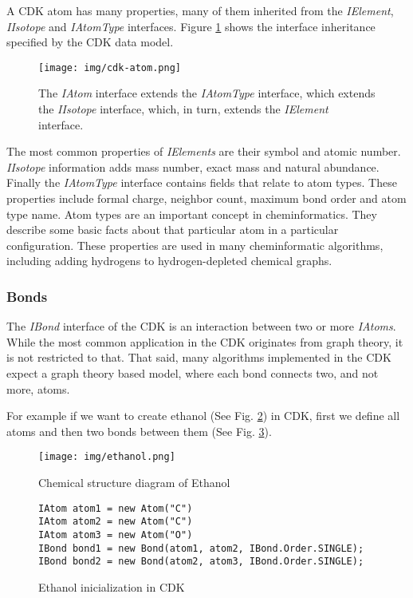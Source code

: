\documentclass[thesis=M,english]{FITthesis}[2012/10/20]
\begin{document}
A CDK atom has many properties, many of them inherited from the \textit{IElement}, \textit{IIsotope} and \textit{IAtomType} interfaces. Figure \ref{fig:cdkAtomModel} shows the interface inheritance specified by the CDK data model. 

\begin{figure}
  \centering
  \texttt{[image: img/cdk-atom.png]}
  \caption{The \textit{IAtom} interface extends the \textit{IAtomType} interface,
which extends the \textit{IIsotope} interface, which, in turn, extends
the \textit{IElement} interface.}
  \label{fig:cdkAtomModel}
\end{figure}

The most common properties of \textit{IElements} are their symbol and atomic number. \textit{IIsotope} information adds mass number, exact mass and natural abundance. Finally the \textit{IAtomType} interface contains fields that relate to atom types. These properties include formal charge, neighbor count, maximum bond order and atom type name. Atom types are an important concept in cheminformatics. They describe some basic facts about that particular atom in a particular configuration. These properties are used in many cheminformatic algorithms, including adding hydrogens to hydrogen-depleted chemical graphs.\cite{cdk}

\subsubsection{Bonds}
The \textit{IBond} interface of the CDK is an interaction between two or more \textit{IAtoms}. While the most common application in the CDK originates from graph theory, it is not restricted to that. That said, many algorithms implemented in the CDK expect a graph theory based model, where each bond connects two, and not more, atoms.

For example if we want to create ethanol (See Fig. \ref{fig:ethanol}) in CDK, first we define all atoms and then two bonds between them (See Fig. \ref{cdkEthanolCode}).

\begin{figure}
  \centering
  \texttt{[image: img/ethanol.png]}
  \caption{Chemical structure diagram of Ethanol}
  \label{fig:ethanol}
\end{figure}

\begin{figure}
\begin{lstlisting}
IAtom atom1 = new Atom("C")
IAtom atom2 = new Atom("C")
IAtom atom3 = new Atom("O")
IBond bond1 = new Bond(atom1, atom2, IBond.Order.SINGLE);
IBond bond2 = new Bond(atom2, atom3, IBond.Order.SINGLE);
\end{lstlisting}
\caption{Ethanol inicialization in CDK}
\label{cdkEthanolCode}
\end{figure}
\end{document}
